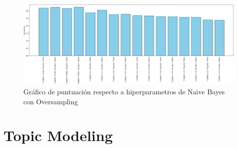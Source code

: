 \documentclass{report}
\begin{document}
{\begin{longtable}{|p{155.6px}|p{100.3px}|}
                \end{longtable}
                \begin{figure}[H]
                    \centering
                    \includegraphics[width=1\linewidth]{img/ibai4.png}
                    \caption{Gráfico de puntuación respecto a hiperparametros de Naive Bayes con Oversampling}
                \end{figure}
        \clearpage
        \section{Topic Modeling}
}
\end{document}
